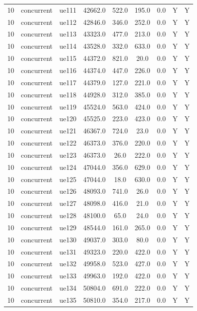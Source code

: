 \begin{table}[ht]
\begin{tabular}{|c|c|c|c|c|c|c|c|c|}
10 & concurrent & ue111 & 42662.0 & 522.0 & 195.0 & 0.0 & Y & Y \\
10 & concurrent & ue112 & 42846.0 & 346.0 & 252.0 & 0.0 & Y & Y \\
10 & concurrent & ue113 & 43323.0 & 477.0 & 213.0 & 0.0 & Y & Y \\
10 & concurrent & ue114 & 43528.0 & 332.0 & 633.0 & 0.0 & Y & Y \\
10 & concurrent & ue115 & 44372.0 & 821.0 & 20.0 & 0.0 & Y & Y \\
10 & concurrent & ue116 & 44374.0 & 447.0 & 226.0 & 0.0 & Y & Y \\
10 & concurrent & ue117 & 44379.0 & 127.0 & 221.0 & 0.0 & Y & Y \\
10 & concurrent & ue118 & 44928.0 & 312.0 & 385.0 & 0.0 & Y & Y \\
10 & concurrent & ue119 & 45524.0 & 563.0 & 424.0 & 0.0 & Y & Y \\
10 & concurrent & ue120 & 45525.0 & 223.0 & 423.0 & 0.0 & Y & Y \\
10 & concurrent & ue121 & 46367.0 & 724.0 & 23.0 & 0.0 & Y & Y \\
10 & concurrent & ue122 & 46373.0 & 376.0 & 220.0 & 0.0 & Y & Y \\
10 & concurrent & ue123 & 46373.0 & 26.0 & 222.0 & 0.0 & Y & Y \\
10 & concurrent & ue124 & 47044.0 & 356.0 & 629.0 & 0.0 & Y & Y \\
10 & concurrent & ue125 & 47044.0 & 18.0 & 630.0 & 0.0 & Y & Y \\
10 & concurrent & ue126 & 48093.0 & 741.0 & 26.0 & 0.0 & Y & Y \\
10 & concurrent & ue127 & 48098.0 & 416.0 & 21.0 & 0.0 & Y & Y \\
10 & concurrent & ue128 & 48100.0 & 65.0 & 24.0 & 0.0 & Y & Y \\
10 & concurrent & ue129 & 48544.0 & 161.0 & 265.0 & 0.0 & Y & Y \\
10 & concurrent & ue130 & 49037.0 & 303.0 & 80.0 & 0.0 & Y & Y \\
10 & concurrent & ue131 & 49323.0 & 220.0 & 422.0 & 0.0 & Y & Y \\
10 & concurrent & ue132 & 49958.0 & 523.0 & 427.0 & 0.0 & Y & Y \\
10 & concurrent & ue133 & 49963.0 & 192.0 & 422.0 & 0.0 & Y & Y \\
10 & concurrent & ue134 & 50804.0 & 691.0 & 222.0 & 0.0 & Y & Y \\
10 & concurrent & ue135 & 50810.0 & 354.0 & 217.0 & 0.0 & Y & Y \\

\end{tabular}
\end{table}
